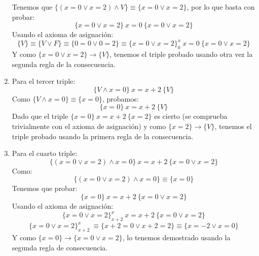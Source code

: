 \begin{ejemplo}
\begin{enumerate}
\begin{equation*}
            \end{equation*}
            Tenemos que $\{(x=0 \lor x=2) \land V\}\equiv \{x= 0 \lor x=2\}$, por lo que basta con probar:
            \begin{equation*}
                \{x=0 \lor x=2\}\ x=0\ \{x=0 \lor x=2\}
            \end{equation*}
            Usando el axioma de asignación:
            \begin{equation*}
                \{V\} \equiv \{V \lor F\} \equiv \{0=0 \lor 0=2\} \equiv \{x=0 \lor x=2\}^x_0\ x=0\ \{x=0 \lor x=2\}
            \end{equation*}
            Y como $\{x=0 \lor x=2\} \rightarrow \{V\}$, tenemos el triple probado usando otra vez la segunda regla de la consecuencia.
        \item Para el tercer triple:
            \begin{equation*}
                \{V \land x=0\}\ x=x+2\ \{V\}
            \end{equation*}
            Como $\{V \land x=0\}\equiv \{x=0\}$, probamos:
            \begin{equation*}
                \{x=0\}\ x=x+2\ \{V\}
            \end{equation*}
            Dado que el triple $\{x=0\}\ x=x+2\ \{x=2\}$ es cierto (se comprueba trivialmente con el axioma de asignación) y como $\{x=2\}\rightarrow\{V\}$, tenemos el triple probado usando la primera regla de la consecuencia.
        \item Para el cuarto triple:
            \begin{equation*}
                \{(x=0 \lor x=2)\land x=0\}\ x=x+2\ \{x=0 \lor x=2\}
            \end{equation*}
            Como:
            \begin{equation*}
                \{(x=0 \lor x=2) \land x=0\} \equiv \{x=0\}
            \end{equation*}
            Tenemos que probar:
            \begin{equation*}
                \{x=0\}\ x=x+2\ \{x=0 \lor x=2\}
            \end{equation*}
            Usando el axioma de asignación:
            \begin{equation*}
                \{x=0 \lor x=2\}^x_{x+2}\ x=x+2\ \{x=0 \lor x=2\}
            \end{equation*}
            \begin{equation*}
                \{x=0 \lor x=2\}^x_{x+2}\ \equiv \{x+2=0 \lor x+2=2\} \equiv \{x=-2 \lor x=0\}
            \end{equation*}
            Y como $\{x=0\}\rightarrow\{x=0 \lor x=2\}$, lo tenemos demostrado usando la segunda regla de consecuencia.
    \end{enumerate}
    
\end{ejemplo}

